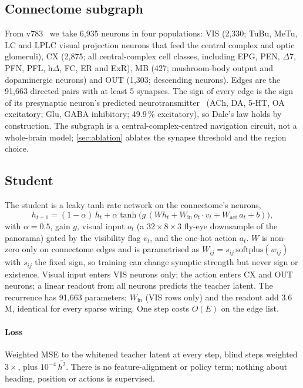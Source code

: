 \subsection{Connectome subgraph}
\label{sec:connectome}
From \flywire v783~\cite{dorkenwald2024neuronal,schlegel2024whole} we take 6,935 neurons in four populations: VIS
(2,330; TuBu, MeTu, LC and LPLC visual projection neurons that feed the central complex and optic glomeruli), CX (2,875;
all central-complex cell classes, including EPG, PEN, $\Delta$7, PFN, PFL, h$\Delta$, FC, ER and ExR), MB (427; mushroom-body
output and dopaminergic neurons) and OUT (1,303; descending neurons). Edges are the 91,663 directed pairs with at least
5 synapses. The sign of every edge is the sign of its presynaptic neuron's predicted
neurotransmitter~\cite{eckstein2024neurotransmitter} (ACh, DA, 5-HT, OA excitatory; Glu, GABA inhibitory; 49.9\,\%
excitatory), so Dale's law holds by construction. The subgraph is a central-complex-centred navigation circuit, not a
whole-brain model; \cref{sec:ablation} ablates the synapse threshold and the region choice.

\subsection{Student}
\label{sec:student}
The student is a leaky tanh rate network on the connectome's neurons,
\begin{equation}
  h_{t+1} = (1-\alpha)\,h_t + \alpha\tanh\!\big(g\,(W h_t + W_{\text{in}}\, o_t \cdot v_t + W_{\text{act}}\, a_t + b)\big),
  \label{eq:student}
\end{equation}
with $\alpha = 0.5$, gain $g$, visual input $o_t$ (a $32\times8\times3$ fly-eye downsample of the panorama) gated by the
visibility flag $v_t$, and the one-hot action $a_t$. $W$ is non-zero only on connectome edges and is parametrised as
$W_{ij} = s_{ij}\,\mathrm{softplus}(w_{ij})$ with $s_{ij}$ the fixed sign, so training can change synaptic strength but
never sign or existence. Visual input enters VIS neurons only; the action enters CX and OUT neurons; a linear readout
from all neurons predicts the teacher latent. The recurrence has 91,663 parameters; $W_{\text{in}}$ (VIS rows only) and
the readout add 3.6\,M, identical for every sparse wiring. One step costs $O(E)$ on the edge list.

\paragraph{Loss} Weighted MSE to the whitened teacher latent at every step, blind steps weighted $3\times$, plus
$10^{-4}\,\overline{h^2}$. There is no feature-alignment or policy term; nothing about heading, position or actions is
supervised.

